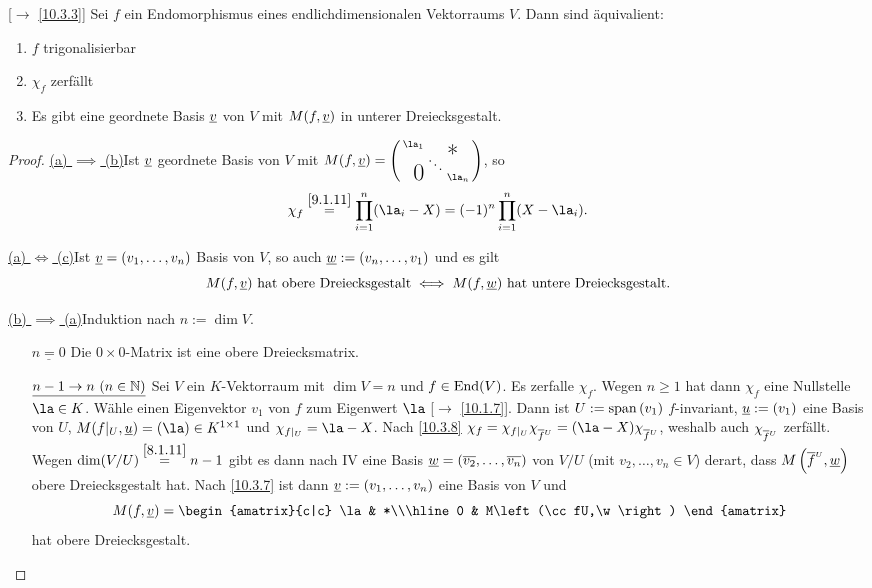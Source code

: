 \documentclass[../../main.tex]{subfiles}
\begin{document}
\begin{sat}\label{10.3.9}
{\rm[$\to$ \ref{10.3.3}]} Sei $f$ ein Endomorphismus eines endlichdimensionalen Vektorraums $V$. Dann sind äquivalient:
\begin{enumerate}[\rm(a)]
\item $f$ trigonalisierbar
\item $\chi_f$ zerfällt
\item Es gibt eine geordnete Basis ${\underline v}$ von $V$ mit $M(f,{\underline v})$ in unterer Dreiecksgestalt.
\end{enumerate}
\end{sat}
\begin{proof}
\underline{(a) $\implies$ (b)}\quad Ist ${\underline v}$ geordnete Basis von $V$ mit $M(f,\v) = \left(\begin{smallmatrix}
\la_1 & & \llap{$\overset{\blap{\LARGE *}}{~}$} \\
& \ddots &\\
\rlap{\tlap{\LARGE 0}} & & \la_n
\end{smallmatrix}\right)$, so
$$\chi_f \overset{\ref{9.1.11}}{=} \prod_{i = 1}^{n}(\la_i - X) = (-1)^n\prod_{i = 1}^{n}(X-\la_i).$$

\underline{(a) $\iff$ (c)}\quad Ist ${\underline v} = (v_1,\ldots,v_n)$ Basis von $V$, so auch ${\underline w} := (v_n,\ldots,v_1)$ und es gilt
\[M(f,{\underline v})\text{ hat obere Dreiecksgestalt}\iff M(f,{\underline w})\text{ hat untere Dreiecksgestalt}.\]

\smallskip
\underline{(b) $\implies$ (a)}\quad Induktion nach $n:=\dim V$.
\begin{itemize}
\item[$\underline{n = 0}$]\quad Die $0\times 0$-Matrix ist eine obere Dreiecksmatrix.
\item[$\underline{n-1\to n ~(n\in \mathbb N)}$]\quad Sei $V$ ein $K$-Vektorraum mit $\dim V = n$ und $f\in\operatorname{End}(V)$. Es zerfalle $\chi_f$. Wegen $n\ge 1$ hat dann $\chi_f$ eine Nullstelle $\la\in K$. Wähle einen Eigenvektor $v_1$ von $f$ zum Eigenwert $\la$ [$\to$ \ref{10.1.7}]. Dann ist $U:= \operatorname{span}\left(v_1\right)$ $f$-invariant, ${\underline u}:= (v_1)$ eine Basis von $U$, $M(f|_U,\u) = (\la)\in K^{1\times 1}$ und $\chi_{f|_U} = \la - X$. Nach \ref{10.3.8} $\chi_f = \chi_{f|_U}\chi_{\cc fU}=(\la-X)\chi_{\cc fU}$, weshalb auch $\chi_{\overline{f}^{\substack{\\\scriptscriptstyle U}}}$ zerfällt. Wegen $\dim(V/U) \overset{\ref{8.1.11}}{=} n-1$ gibt es dann nach IV eine Basis ${\underline w} = (\overline{v_2},\ldots,\overline{v_n})$ von $V/U$ (mit $v_2,\ldots,v_n\in V$) derart, dass $M\left(\overline{f}^{\substack{\\\scriptscriptstyle U}}, {\underline w}\right)$ obere Dreiecksgestalt hat. Nach \ref{10.3.7} ist dann ${\underline v} := (v_1,\ldots,v_n)$ eine Basis von $V$
und \[M(f,\v) = \begin{amatrix}{c|c}
\la & *\\\hline
0 & M\left(\cc fU,\w\right)
\end{amatrix}\] hat obere Dreiecksgestalt.
\end{itemize}
\end{proof}
\end{document}
